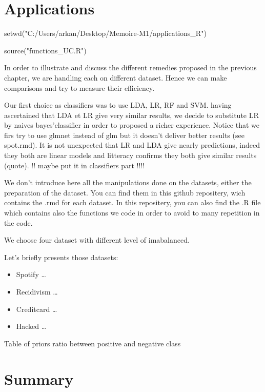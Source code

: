 \documentclass[
]{book}
\newenvironment{Shaded}{\begin{snugshade}}{\end{snugshade}}
\newcommand{\FunctionTok}[1]{\textcolor[rgb]{0.00,0.00,0.00}{#1}}
\newcommand{\NormalTok}[1]{#1}
\newcommand{\StringTok}[1]{\textcolor[rgb]{0.31,0.60,0.02}{#1}}
\providecommand{\tightlist}{%
  \setlength{\itemsep}{0pt}\setlength{\parskip}{0pt}}
\begin{document}
\hypertarget{applications}{%
\chapter{Applications}\label{applications}}

\begin{Shaded}
\begin{Highlighting}[]
\FunctionTok{setwd}\NormalTok{(}\StringTok{"C:/Users/arkan/Desktop/Memoire{-}M1/applications\_R"}\NormalTok{)}
\end{Highlighting}
\end{Shaded}

\begin{Shaded}
\begin{Highlighting}[]
\FunctionTok{source}\NormalTok{(}\StringTok{"functions\_UC.R"}\NormalTok{)}
\end{Highlighting}
\end{Shaded}

In order to illustrate and discuss the different remedies proposed in the previous chapter, we are handling each on different dataset. Hence we can make comparisons and try to measure their efficiency.

Our first choice as classifiers was to use LDA, LR, RF and SVM. having ascertained that LDA et LR give very similar results, we decide to substitute LR by naives bayes'classifier in order to proposed a richer experience. Notice that we firs try to use glmnet instead of glm but it doesn't deliver better results (see spot.rmd). It is not unexpected that LR and LDA give nearly predictions, indeed they both are linear models and litteracy confirms they both give similar results (quote). !! maybe put it in classifiers part !!!!

We don't introduce here all the manipulations done on the datasets, either the preparation of the dataset. You can find them in this github repositery, wich contains the .rmd for each dataset. In this repositery, you can also find the .R file which contains also the functions we code in order to avoid to many repetition in the code.

We choose four dataset with different level of imabalanced.

Let's briefly presents those datasets:

\begin{itemize}
\tightlist
\item
  Spotify \ldots{}
\item
  Recidivism \ldots{}
\item
  Creditcard \ldots{}
\item
  Hacked \ldots{}
\end{itemize}

Table of priors ratio between positive and negative class

\hypertarget{summary}{%
\chapter{Summary}\label{summary}}

  
\end{document}
